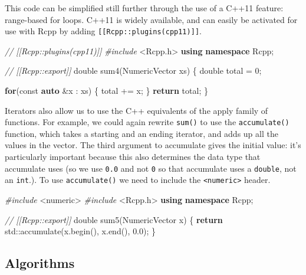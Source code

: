 \documentclass[]{book}
\newenvironment{Shaded}{\begin{snugshade}}{\end{snugshade}}
\newcommand{\AttributeTok}[1]{\textcolor[rgb]{0.61,0.61,0.61}{#1}}
\newcommand{\BuiltInTok}[1]{#1}
\newcommand{\CommentTok}[1]{\textcolor[rgb]{0.37,0.37,0.37}{\textit{#1}}}
\newcommand{\ControlFlowTok}[1]{\textcolor[rgb]{0.27,0.27,0.27}{\textbf{#1}}}
\newcommand{\DataTypeTok}[1]{\textcolor[rgb]{0.27,0.27,0.27}{#1}}
\newcommand{\DecValTok}[1]{\textcolor[rgb]{0.06,0.06,0.06}{#1}}
\newcommand{\FloatTok}[1]{\textcolor[rgb]{0.06,0.06,0.06}{#1}}
\newcommand{\ImportTok}[1]{#1}
\newcommand{\KeywordTok}[1]{\textcolor[rgb]{0.27,0.27,0.27}{\textbf{#1}}}
\newcommand{\NormalTok}[1]{#1}
\newcommand{\PreprocessorTok}[1]{\textcolor[rgb]{0.37,0.37,0.37}{\textit{#1}}}
\begin{document}
This code can be simplified still further through the use of a C++11 feature: range-based for loops. C++11 is widely available, and can easily be activated for use with Rcpp by adding \texttt{{[}{[}Rcpp::plugins(cpp11){]}{]}}.

\begin{Shaded}
\begin{Highlighting}[]
\CommentTok{// [[Rcpp::plugins(cpp11)]]}
\PreprocessorTok{#include }\ImportTok{<Rcpp.h>}
\KeywordTok{using} \KeywordTok{namespace}\NormalTok{ Rcpp;}

\CommentTok{// [[Rcpp::export]]}
\DataTypeTok{double}\NormalTok{ sum4(NumericVector xs) \{}
  \DataTypeTok{double}\NormalTok{ total = }\DecValTok{0}\NormalTok{;}
  
  \ControlFlowTok{for}\NormalTok{(}\AttributeTok{const} \KeywordTok{auto}\NormalTok{ &x : xs) \{}
\NormalTok{    total += x;}
\NormalTok{  \}}
  \ControlFlowTok{return}\NormalTok{ total;}
\NormalTok{\}}
\end{Highlighting}
\end{Shaded}

Iterators also allow us to use the C++ equivalents of the apply family of functions. For example, we could again rewrite \texttt{sum()} to use the \texttt{accumulate()} function, which takes a starting and an ending iterator, and adds up all the values in the vector. The third argument to accumulate gives the initial value: it's particularly important because this also determines the data type that accumulate uses (so we use \texttt{0.0} and not \texttt{0} so that accumulate uses a \texttt{double}, not an \texttt{int}.). To use \texttt{accumulate()} we need to include the \texttt{\textless{}numeric\textgreater{}} header.

\begin{Shaded}
\begin{Highlighting}[]
\PreprocessorTok{#include }\ImportTok{<numeric>}
\PreprocessorTok{#include }\ImportTok{<Rcpp.h>}
\KeywordTok{using} \KeywordTok{namespace}\NormalTok{ Rcpp;}

\CommentTok{// [[Rcpp::export]]}
\DataTypeTok{double}\NormalTok{ sum5(NumericVector x) \{}
  \ControlFlowTok{return} \BuiltInTok{std::}\NormalTok{accumulate(x.begin(), x.end(), }\FloatTok{0.0}\NormalTok{);}
\NormalTok{\}}
\end{Highlighting}
\end{Shaded}

\hypertarget{algorithms}{%
\subsection{Algorithms}\label{algorithms}}
\end{document}
